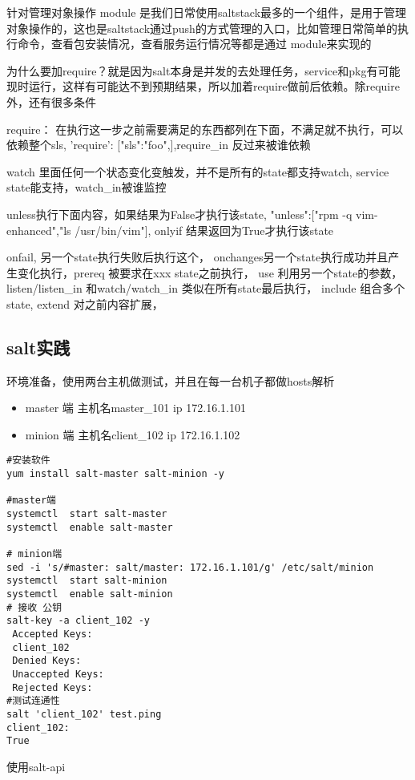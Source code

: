 针对管理对象操作
module 是我们日常使用saltstack最多的一个组件，是用于管理对象操作的，这也是saltstack通过push的方式管理的入口，比如管理日常简单的执行命令，查看包安装情况，查看服务运行情况等都是通过 module来实现的 


为什么要加require？就是因为salt本身是并发的去处理任务，service和pkg有可能现时运行，这样有可能达不到预期结果，所以加着require做前后依赖。除require外，还有很多条件

require： 在执行这一步之前需要满足的东西都列在下面，不满足就不执行，可以依赖整个sls, {'require': [{"sls":"foo"},]},require_in 反过来被谁依赖

watch 里面任何一个状态变化变触发，并不是所有的state都支持watch, service state能支持，watch_in被谁监控

unless执行下面内容，如果结果为False才执行该state, {"unless":["rpm -q vim-enhanced","ls /usr/bin/vim"]}, onlyif 结果返回为True才执行该state

 
onfail, 另一个state执行失败后执行这个， onchanges另一个state执行成功并且产生变化执行，prereq 被要求在xxx state之前执行， use 利用另一个state的参数，
listen/listen_in 和watch/watch_in 类似在所有state最后执行， include 组合多个state, extend 对之前内容扩展， 


\subsection{salt实践}

环境准备，使用两台主机做测试，并且在每一台机子都做hosts解析 

\begin{itemize}
\item master 端 主机名master_101 ip 172.16.1.101
\item minion 端 主机名client_102 ip 172.16.1.102
\end{itemize}

\begin{lstlisting}
#安装软件
yum install salt-master salt-minion -y

#master端
systemctl  start salt-master
systemctl  enable salt-master 

# minion端
sed -i 's/#master: salt/master: 172.16.1.101/g' /etc/salt/minion
systemctl  start salt-minion 
systemctl  enable salt-minion 
# 接收 公钥
salt-key -a client_102 -y
 Accepted Keys:
 client_102
 Denied Keys:
 Unaccepted Keys:
 Rejected Keys:
#测试连通性
salt 'client_102' test.ping
client_102:
True
\end{lstlisting}

使用salt-api

